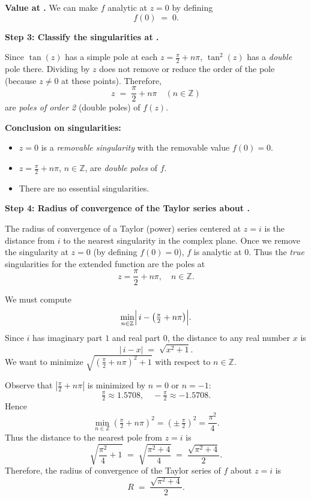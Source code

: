 \documentclass[12pt]{article}
\theoremstyle{definition} %
\theoremstyle{plain} %
\begin{document}
\medskip
\noindent
\textbf{Value at .} We can make $f$ analytic at $z=0$ by defining
\[
f(0) \;=\; 0.
\]

\medskip
\noindent
\textbf{Step 3: Classify the singularities at .}

Since $\tan(z)$ has a simple pole at each $z = \tfrac{\pi}{2} + n\pi$, $\tan^2(z)$ has a \emph{double} pole there. Dividing by $z$ does not remove or reduce the order of the pole (because $z \neq 0$ at these points). Therefore,
\[
z \;=\; \frac{\pi}{2} + n\pi \quad (n \in \mathbb{Z})
\]
are \emph{poles of order 2} (double poles) of $f(z)$. 

\medskip
\noindent
\textbf{Conclusion on singularities:}
\begin{itemize}
\item $z=0$ is a \emph{removable singularity} with the removable value $f(0) = 0$.
\item $z = \frac{\pi}{2} + n\pi$, $n \in \mathbb{Z}$, are \emph{double poles} of $f$.
\item There are no essential singularities.
\end{itemize}

\medskip
\noindent
\textbf{Step 4: Radius of convergence of the Taylor series about .}

The radius of convergence of a Taylor (power) series centered at $z=i$ is the distance from $i$ to the nearest singularity in the complex plane. Once we remove the singularity at $z=0$ (by defining $f(0)=0$), $f$ is analytic at $0$. Thus the \emph{true} singularities for the extended function are the poles at
\[
z = \frac{\pi}{2} + n\pi, \quad n \in \mathbb{Z}.
\]

We must compute
\[
\min_{n \in \mathbb{Z}} \Bigl|\,i - \bigl(\tfrac{\pi}{2} + n\pi\bigr)\Bigr|.
\]
Since $i$ has imaginary part $1$ and real part $0$, the distance to any real number $x$ is
\[
|\,i - x| \;=\; \sqrt{x^2 + 1}.
\]
We want to minimize $\sqrt{\left(\tfrac{\pi}{2} + n\pi\right)^2 + 1}$ with respect to $n \in \mathbb{Z}$. 

Observe that $\left|\tfrac{\pi}{2} + n\pi\right|$ is minimized by $n=0$ or $n=-1$:
\[
\tfrac{\pi}{2} \approx 1.5708,\quad
-\tfrac{\pi}{2} \approx -1.5708.
\]
Hence 
\[
\min_{n\in\mathbb{Z}} \left(\tfrac{\pi}{2} + n\pi\right)^2
= \left(\pm\,\tfrac{\pi}{2}\right)^2
= \frac{\pi^2}{4}.
\]
Thus the distance to the nearest pole from $z=i$ is
\[
\sqrt{\frac{\pi^2}{4} + 1} 
\;=\;
\sqrt{\frac{\pi^2 + 4}{4}}
\;=\;
\frac{\sqrt{\pi^2 + 4}}{2}.
\]
Therefore, the radius of convergence of the Taylor series of $f$ about $z = i$ is
\[
R \;=\; \frac{\sqrt{\pi^2 + 4}}{2}.
\]
\end{document}
